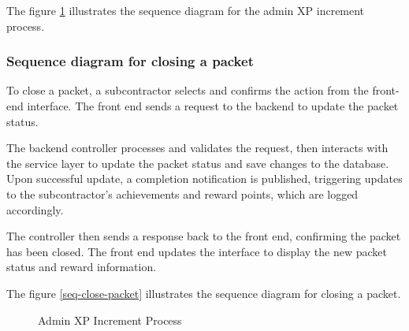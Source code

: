 \noindent The figure \ref{fig:admin-xp-increment-process} illustrates the sequence diagram for the admin XP increment process.

\subsubsection{Sequence diagram for closing a packet}

To close a packet, a subcontractor selects and confirms the action from the front-end interface. The front end sends a request to the backend to update the packet status.

The backend controller processes and validates the request, then interacts with the service layer to update the packet status and save changes to the database. Upon successful update, a completion notification is published, triggering updates to the subcontractor's achievements and reward points, which are logged accordingly.

The controller then sends a response back to the front end, confirming the packet has been closed. The front end updates the interface to display the new packet status and reward information.

\noindent The figure \ref{seq-close-packet} illustrates the sequence diagram for closing a packet.

\begin{landscape}
    \begin{figure}[H]
        \centering
        \caption{Admin XP Increment Process}
        \label{fig:admin-xp-increment-process}
    \end{figure}
\end{landscape}

